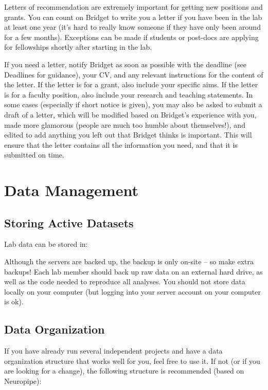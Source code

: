\documentclass[]{book}
\begin{document}
Letters of recommendation are extremely important for getting new positions and grants. You can count on Bridget to write you a letter if you have been in the lab at least one year (it's hard to really know someone if they have only been around for a few months). Exceptions can be made if students or post-docs are applying for fellowships shortly after starting in the lab.

If you need a letter, notify Bridget as soon as possible with the deadline (see Deadlines for guidance), your CV, and any relevant instructions for the content of the letter. If the letter is for a grant, also include your specific aims. If the letter is for a faculty position, also include your research and teaching statements. In some cases (especially if short notice is given), you may also be asked to submit a draft of a letter, which will be modified based on Bridget's experience with you, made more glamorous (people are much too humble about themselves!), and edited to add anything you left out that Bridget thinks is important. This will ensure that the letter contains all the information you need, and that it is submitted on time.

\hypertarget{data-management}{%
\section{Data Management}\label{data-management}}

\hypertarget{storing-active-datasets}{%
\subsection{Storing Active Datasets}\label{storing-active-datasets}}

Lab data can be stored in:

Although the servers are backed up, the backup is only on-site -- so make extra backups! Each lab member should back up raw data on an external hard drive, as well as the code needed to reproduce all analyses. You should not store data locally on your computer (but logging into your server account on your computer is ok).

\hypertarget{data-organization}{%
\subsection{Data Organization}\label{data-organization}}

If you have already run several independent projects and have a data organization structure that works well for you, feel free to use it. If not (or if you are looking for a change), the following structure is recommended (based on Neuropipe):
\end{document}
